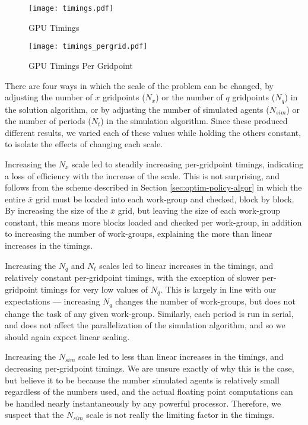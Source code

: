 \documentclass[a4paper,12pt]{article}
\numberwithin{equation}{section}
\theoremstyle{definition}
\begin{document}
\begin{figure}[ht]
  \centering
  \caption{GPU Timings}
  \label{fig:timings}
  \texttt{[image: timings.pdf]}
\end{figure}

\begin{figure}[ht]
  \centering
  \caption{GPU Timings Per Gridpoint}
  \label{fig:timings_pergrid}
  \texttt{[image: timings\_pergrid.pdf]}
\end{figure}

There are four ways in which the scale of the problem can be changed,
by adjusting the number of $x$ gridpoints ($N_x$) or the number of $q$
gridpoints ($N_q$) in the solution algorithm, or by adjusting the
number of simulated agents ($N_{sim}$) or the number of periods
($N_t$) in the simulation algorithm. Since these produced different
results, we varied each of these values while holding the others
constant, to isolate the effects of changing each scale.

Increasing the $N_x$ scale led to steadily increasing per-gridpoint
timings, indicating a loss of efficiency with the increase of the
scale. This is not surprising, and follows from the scheme described
in Section \ref{sec:optim-policy-algor} in which the entire $\bar{x}$
grid must be loaded into each work-group and checked, block by
block. By increasing the size of the $\bar{x}$ grid, but leaving the
size of each work-group constant, this means more blocks loaded and
checked per work-group, in addition to increasing the number of
work-groups, explaining the more than linear increases in the timings.

Increasing the $N_q$ and $N_t$ scales led to linear increases in the
timings, and relatively constant per-gridpoint timings, with the
exception of slower per-gridpoint timings for very low values of
$N_q$. This is largely in line with our expectations --- increasing
$N_q$ changes the number of work-groups, but does not change the task
of any given work-group. Similarly, each period is run in serial, and
does not affect the parallelization of the simulation algorithm, and
so we should again expect linear scaling.

Increasing the $N_{sim}$ scale led to less than linear increases in
the timings, and decreasing per-gridpoint timings. We are unsure
exactly of why this is the case, but believe it to be because the
number simulated agents is relatively small regardless of the numbers
used, and the actual floating point computations can be handled nearly
instantaneously by any powerful processor. Therefore, we suspect that
the $N_{sim}$ scale is not really the limiting factor in the timings.
\end{document}
